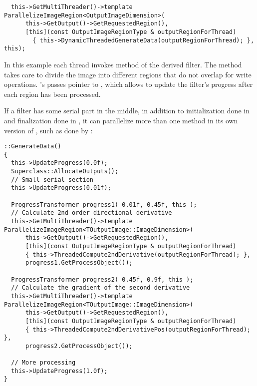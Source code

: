 \small
\begin{verbatim}
  this->GetMultiThreader()->template ParallelizeImageRegion<OutputImageDimension>(
      this->GetOutput()->GetRequestedRegion(),
      [this](const OutputImageRegionType & outputRegionForThread)
        { this->DynamicThreadedGenerateData(outputRegionForThread); }, this);
\end{verbatim}
\normalsize

In this example each thread invokes 
method of the derived filter. The 
method takes care to divide the image into different regions
that do not overlap for write operations.
's  passes  pointer
to , which allows 
to update the filter's progress after each region has been processed.

If a filter has some serial part in the middle, in addition to initialization
done in  and finalization done in
, it can parallelize more than one method
in its own version of , such as done by
:

\small
\begin{verbatim}
::GenerateData()
{
  this->UpdateProgress(0.0f);
  Superclass::AllocateOutputs();
  // Small serial section
  this->UpdateProgress(0.01f);

  ProgressTransformer progress1( 0.01f, 0.45f, this );
  // Calculate 2nd order directional derivative
  this->GetMultiThreader()->template ParallelizeImageRegion<TOutputImage::ImageDimension>(
      this->GetOutput()->GetRequestedRegion(),
      [this](const OutputImageRegionType & outputRegionForThread)
      { this->ThreadedCompute2ndDerivative(outputRegionForThread); },
      progress1.GetProcessObject());

  ProgressTransformer progress2( 0.45f, 0.9f, this );
  // Calculate the gradient of the second derivative
  this->GetMultiThreader()->template ParallelizeImageRegion<TOutputImage::ImageDimension>(
      this->GetOutput()->GetRequestedRegion(),
      [this](const OutputImageRegionType & outputRegionForThread)
      { this->ThreadedCompute2ndDerivativePos(outputRegionForThread); },
      progress2.GetProcessObject());

  // More processing
  this->UpdateProgress(1.0f);
}
\end{verbatim}
\normalsize

